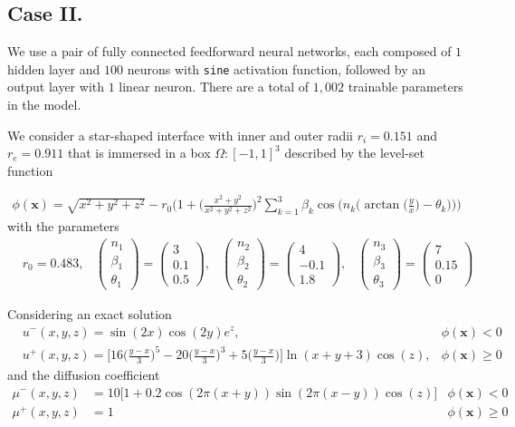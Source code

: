 \documentclass{elsarticle}
\begin{document}
\subsection{Case II.}

We use a pair of fully connected feedforward neural networks, each composed of $1$ hidden layer and $100$ neurons with \texttt{sine} activation function, followed  by an output layer with $1$ linear neuron. There are a total of $1,002$ trainable parameters in the model.

We consider a star-shaped interface with inner and outer radii $r_i=0.151$ and $r_e=0.911$ that is immersed in a box $\Omega:[-1,1]^3$ described by the level-set function

\begin{align*}
\phi(\mathbf{x}) = \sqrt{x^2 + y^2 + z^2} - r_0 \bigg( 1 + \big( \frac{x^2 + y^2}{x^2 + y^2 + z^2}\big)^2  \sum_{k=1}^3 \beta_k \cos\big(n_k \big(\arctan\big(\frac{y}{x}\big) - \theta_k\big) \big) \bigg)
\end{align*}
with the parameters
\begin{align*}
&r_0 = 0.483, &\begin{pmatrix}
n_1\\
\beta_1\\
\theta_1
\end{pmatrix}=\begin{pmatrix}
3\\
0.1\\
0.5
\end{pmatrix}, &\begin{pmatrix}
n_2\\
\beta_2\\
\theta_2
\end{pmatrix}=\begin{pmatrix}
4\\
-0.1\\
1.8
\end{pmatrix}, &\begin{pmatrix}
n_3\\
\beta_3\\
\theta_3
\end{pmatrix}=\begin{pmatrix}
7\\
0.15\\
0
\end{pmatrix}
\end{align*}

Considering an exact solution 
\begin{align*}
& u^-(x,y,z)=\sin(2x)\cos(2y) e^{z}, & \phi(\mathbf{x})<0\\
& u^+(x,y,z)=\bigg[ 16\big(\frac{y-x}{3}\big)^5 - 20 \big(\frac{y-x}{3}\big)^3 + 5\big( \frac{y-x}{3}\big) \bigg]\ln(x+y+3)\cos(z)          , & \phi(\mathbf{x})\ge 0
\end{align*}
and the diffusion coefficient
\begin{align*}
\mu^-(x,y,z)&=10\bigg[ 1+0.2\cos(2\pi(x+y))\sin(2\pi(x-y)) \cos(z) \bigg] &\phi(\mathbf{x})<0 \\
\mu^+(x,y,z)&=1 &\phi(\mathbf{x})\ge 0 
\end{align*}
\end{document}
